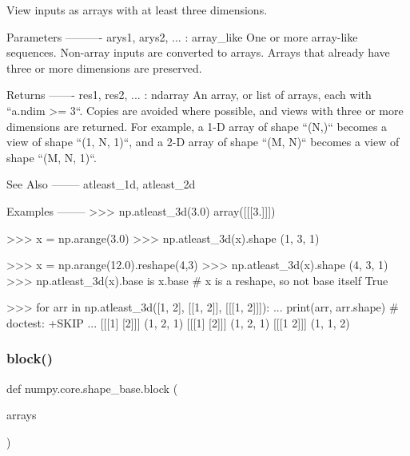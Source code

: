 \begin{DoxyVerb}View inputs as arrays with at least three dimensions.

Parameters
----------
arys1, arys2, ... : array_like
    One or more array-like sequences.  Non-array inputs are converted to
    arrays.  Arrays that already have three or more dimensions are
    preserved.

Returns
-------
res1, res2, ... : ndarray
    An array, or list of arrays, each with ``a.ndim >= 3``.  Copies are
    avoided where possible, and views with three or more dimensions are
    returned.  For example, a 1-D array of shape ``(N,)`` becomes a view
    of shape ``(1, N, 1)``, and a 2-D array of shape ``(M, N)`` becomes a
    view of shape ``(M, N, 1)``.

See Also
--------
atleast_1d, atleast_2d

Examples
--------
>>> np.atleast_3d(3.0)
array([[[3.]]])

>>> x = np.arange(3.0)
>>> np.atleast_3d(x).shape
(1, 3, 1)

>>> x = np.arange(12.0).reshape(4,3)
>>> np.atleast_3d(x).shape
(4, 3, 1)
>>> np.atleast_3d(x).base is x.base  # x is a reshape, so not base itself
True

>>> for arr in np.atleast_3d([1, 2], [[1, 2]], [[[1, 2]]]):
...     print(arr, arr.shape) # doctest: +SKIP
...
[[[1]
  [2]]] (1, 2, 1)
[[[1]
  [2]]] (1, 2, 1)
[[[1 2]]] (1, 1, 2)\end{DoxyVerb}
 \mbox{\label{namespacenumpy_1_1core_1_1shape__base_aeee9d1f4c9650bef14225f8cc0777a5b}} 
\subsubsection{\texorpdfstring{block()}{block()}}
{\footnotesize\ttfamily def numpy.\+core.\+shape\+\_\+base.\+block (\begin{DoxyParamCaption}\item[{}]{arrays }\end{DoxyParamCaption})}

